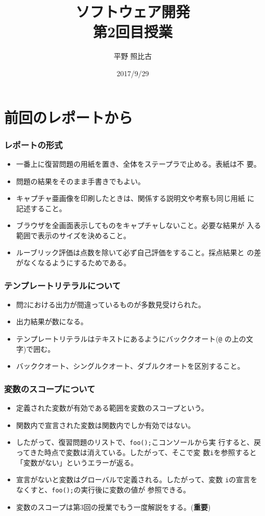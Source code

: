 
\newcommand{\ElmJ}{\texttt}
\title{ソフトウェア開発\\第2回目授業}
\author{平野 照比古}
\institute{}
\date{2017/9/29}

\frame{\maketitle}
\section{前回のレポートから}
\begin{frame}[containsverbatim]
 \frametitle{レポートの形式}
 \begin{itemize}
  \item 一番上に復習問題の用紙を置き、全体をステープラで止める。表紙は不
        要。
  \item 問題の結果をそのまま手書きでもよい。
  \item キャプチャ亜画像を印刷したときは、関係する説明文や考察も同じ用紙
        に記述すること。
  \item ブラウザを全画面表示してものをキャプチャしないこと。必要な結果が
        入る範囲で表示のサイズを決めること。
  \item ルーブリック評価は点数を除いて必ず自己評価をすること。採点結果と
        の差がなくなるようにするためである。
 \end{itemize}
\end{frame}
\begin{frame}[containsverbatim]
 \frametitle{テンプレートリテラルについて}
\begin{itemize}
 \item 問2における出力が間違っているものが多数見受けられた。
 \item 出力結果が数になる。
 \item テンプレートリテラルはテキストにあるようにバッククオート(\Verb+@+
       の上の文字)で囲む。
 \item バッククオート、シングルクオート、ダブルクオートを区別すること。
\end{itemize} 
\end{frame}
\begin{frame}[containsverbatim]
 \frametitle{変数のスコープについて}
\begin{itemize}
 \item 定義された変数が有効である範囲を変数のスコープという。
 \item 関数内で宣言された変数は関数内でしか有効ではない。
 \item したがって、復習問題のリストで、\texttt{foo();}こコンソールから実
       行すると、戻ってきた時点で変数は消えている。したがって、そこで変
       数\texttt{i}を参照すると「変数がない」というエラーが返る。
 \item 宣言がないと変数はグローバルで定義される。したがって、変数
       \texttt{i}の宣言をなくすと、\texttt{foo();}の実行後に変数の値が
       参照できる。
 \item 変数のスコープは第3回の授業でもう一度解説をする。({\bfseries 重要})
\end{itemize} 
\end{frame}
